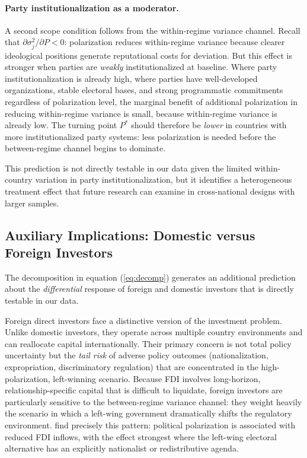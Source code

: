 \documentclass[12pt]{article}
\begin{document}
\paragraph{Party institutionalization as a moderator.} A second scope
condition follows from the within-regime variance channel. Recall that
$\partial \sigma_j^2 / \partial P < 0$: polarization reduces within-regime
variance because clearer ideological positions generate reputational costs
for deviation. But this effect is stronger when parties are \textit{weakly}
institutionalized at baseline. Where party institutionalization is already
high, where parties have well-developed organizations, stable electoral
bases, and strong programmatic commitments regardless of polarization level,
the marginal benefit of additional polarization in reducing within-regime
variance is small, because within-regime variance is already low. The
turning point $P^*$ should therefore be \textit{lower} in countries with
more institutionalized party systems: less polarization is needed before
the between-regime channel begins to dominate.

This prediction is not directly testable in our data given the limited
within-country variation in party institutionalization, but it identifies
a heterogeneous treatment effect that future research can examine in
cross-national designs with larger samples.

\subsection{Auxiliary Implications: Domestic versus Foreign Investors}

The decomposition in equation (\ref{eq:decomp}) generates an additional
prediction about the \textit{differential} response of foreign and domestic
investors that is directly testable in our data.

Foreign direct investors face a distinctive version of the investment problem.
Unlike domestic investors, they operate across multiple country environments
and can reallocate capital internationally. Their primary concern is not
total policy uncertainty but the \textit{tail risk} of adverse policy
outcomes (nationalization, expropriation, discriminatory regulation)
that are concentrated in the high-polarization, left-winning scenario.
Because FDI involves long-horizon, relationship-specific capital that is
difficult to liquidate, foreign investors are particularly sensitive to the
between-regime variance channel: they weight heavily the scenario in which a
left-wing government dramatically shifts the regulatory environment.
\citet{KokashviliBarbakadze2020} find precisely this pattern: political
polarization is associated with reduced FDI inflows, with the effect
strongest where the left-wing electoral alternative has an explicitly
nationalist or redistributive agenda.
\end{document}
